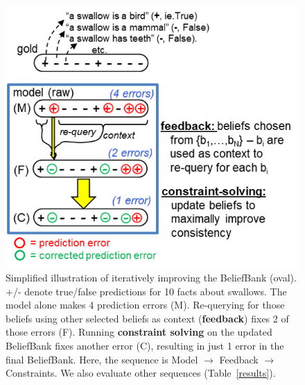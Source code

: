 \documentclass[11pt]{article}
\newcommand{\nk}[1]{\textcolor{green}{Nora: #1}}
\begin{document}
\begin{figure}[t]
\centering
     \includegraphics[width=1\columnwidth]{progression.png}	   %
\caption{Simplified illustration of iteratively improving the BeliefBank (oval). +/- denote true/false predictions for 10 facts about swallows. The model alone makes 4 prediction errors (M). Re-querying for those beliefs using other selected beliefs as context ({\bf feedback}) fixes 2 of those errors (F). Running {\bf constraint solving} on the updated BeliefBank fixes another error (C), resulting in just 1 error in the final BeliefBank. Here, the sequence is Model $\rightarrow$ Feedback $\rightarrow$ Constraints. We also evaluate other sequences (Table~\ref{results}).
\label{progression}}
\end{figure}
\end{document}
